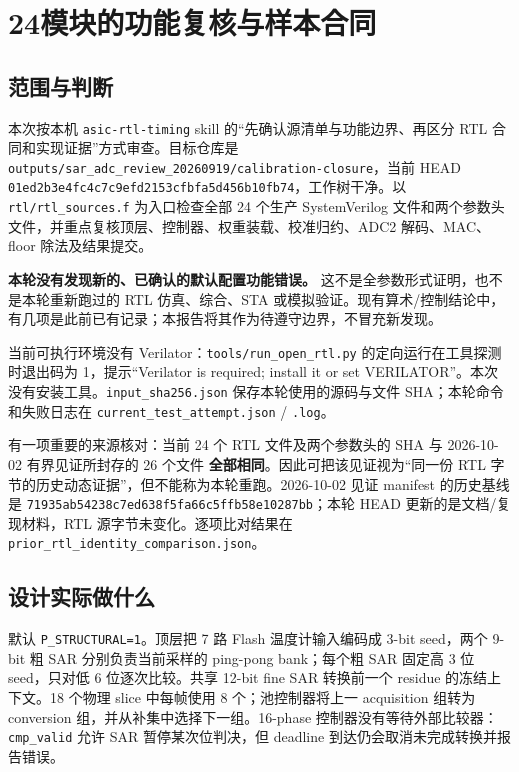 \documentclass[UTF8,fontset=fandol,10pt,a4paper,openany]{ctexrep}
\newcommand{\code}[1]{\nolinkurl{#1}}
\begin{document}
\chapter{24模块的功能复核与样本合同}


\section{范围与判断}


本次按本机 \code{asic-rtl-timing} skill 的“先确认源清单与功能边界、再区分 RTL 合同和实现证据”方式审查。目标仓库是 \code{outputs/sar_adc_review_20260919/calibration-closure}，当前 HEAD \code{01ed2b3e4fc4c7c9efd2153cfbfa5d456b10fb74}，工作树干净。以 \code{rtl/rtl_sources.f} 为入口检查全部 24 个生产 SystemVerilog 文件和两个参数头文件，并重点复核顶层、控制器、权重装载、校准归约、ADC2 解码、MAC、floor 除法及结果提交。


\textbf{本轮没有发现新的、已确认的默认配置功能错误。} 这不是全参数形式证明，也不是本轮重新跑过的 RTL 仿真、综合、STA 或模拟验证。现有算术/控制结论中，有几项是此前已有记录；本报告将其作为待遵守边界，不冒充新发现。


当前可执行环境没有 Verilator：\code{tools/run_open_rtl.py} 的定向运行在工具探测时退出码为 1，提示“Verilator is required; install it or set VERILATOR”。本次没有安装工具。\code{input_sha256.json} 保存本轮使用的源码与文件 SHA；本轮命令和失败日志在 \code{current_test_attempt.json} / \code{.log}。


有一项重要的来源核对：当前 24 个 RTL 文件及两个参数头的 SHA 与 2026-10-02 有界见证所封存的 26 个文件 \textbf{全部相同}。因此可把该见证视为“同一份 RTL 字节的历史动态证据”，但不能称为本轮重跑。2026-10-02 见证 manifest 的历史基线是 \code{71935ab54238c7ed638f5fa66c5ffb58e10287bb}；本轮 HEAD 更新的是文档/复现材料，RTL 源字节未变化。逐项比对结果在 \code{prior_rtl_identity_comparison.json}。


\section{设计实际做什么}


默认 \code{P_STRUCTURAL=1}。顶层把 7 路 Flash 温度计输入编码成 3-bit seed，两个 9-bit 粗 SAR 分别负责当前采样的 ping-pong bank；每个粗 SAR 固定高 3 位 seed，只对低 6 位逐次比较。共享 12-bit fine SAR 转换前一个 residue 的冻结上下文。18 个物理 slice 中每帧使用 8 个；池控制器将上一 acquisition 组转为 conversion 组，并从补集中选择下一组。16-phase 控制器没有等待外部比较器：\code{cmp_valid} 允许 SAR 暂停某次位判决，但 deadline 到达仍会取消未完成转换并报告错误。
\end{document}
